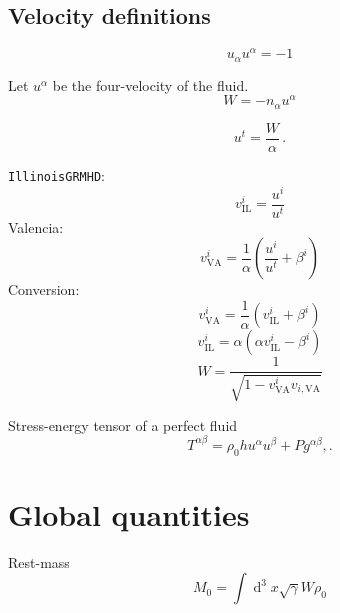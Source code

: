 \documentclass[]{scrartcl}
\renewcommand{\d}[1]{\ensuremath{\operatorname{d}\!{#1}}}
\begin{document}
\subsection{Velocity definitions}
\label{sec:velocity-definitions}

\begin{equation}
  \label{eq:19}
  u_\alpha u^\alpha = -1
\end{equation}

Let $u^\alpha$ be the four-velocity of the fluid.
\begin{equation}
  \label{eq:10}
  W = -n_\alpha u^\alpha
\end{equation}

\begin{equation}
  \label{eq:7}
  u^t = \frac{W}{\alpha}\,.
\end{equation}

\texttt{IllinoisGRMHD}:
\begin{equation}
  \label{eq:13}
  v^i_{\text{IL}} = \frac{u^i}{u^t}
\end{equation}
Valencia:
\begin{equation}
  \label{eq:14}
  v^i_{\text{VA}} = \frac{1}{\alpha} \left( \frac{u^i}{u^t} + \beta^i \right)
\end{equation}
Conversion:
\begin{equation}
  \label{eq:15}
  v^i_{\text{VA}} = \frac{1}{\alpha} \left( v^i_{\text{IL}} + \beta^i \right)
\end{equation}
\begin{equation}
  \label{eq:15}
  v^i_{\text{IL}} = {\alpha} \left( \alpha v^i_{\text{IL}} - \beta^i \right)
\end{equation}
\begin{equation}
  \label{eq:20}
  W = \frac{1}{\sqrt{1 - v^i_{\text{VA}} v_{i,\text{VA}}}}
\end{equation}


Stress-energy tensor of a perfect fluid
\begin{equation}
  \label{eq:8}
  T^{\alpha\beta} = \rho_0 h u^\alpha u^\beta + P g^{\alpha\beta},.
\end{equation}

\section{Global quantities}
\label{sec:global-quantities}

Rest-mass
\begin{equation}
  \label{eq:1}
  M_0 = \int \d{}^{3} x \sqrt{\gamma} W \rho_0
\end{equation}
\end{document}
